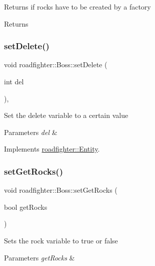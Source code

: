 Returns if rocks have to be created by a factory \begin{DoxyReturn}{Returns}

\end{DoxyReturn}
\mbox{\label{classroadfighter_1_1Boss_a8e2d5737afc0df4bc8b8ad0ddc03f5b8}} 
\subsubsection{\texorpdfstring{set\+Delete()}{setDelete()}}
{\footnotesize\ttfamily void roadfighter\+::\+Boss\+::set\+Delete (\begin{DoxyParamCaption}\item[{int}]{del }\end{DoxyParamCaption})\hspace{0.3cm}{\ttfamily [override]}, {\ttfamily [virtual]}}

Set the delete variable to a certain value 
\begin{DoxyParams}{Parameters}
{\em del} & \\
\hline
\end{DoxyParams}


Implements \hyperlink{classroadfighter_1_1Entity_a07e973f0fa941a69e749629716877692}{roadfighter\+::\+Entity}.

\mbox{\label{classroadfighter_1_1Boss_a86ef044739f08440f8b63a17f3e60d01}} 
\subsubsection{\texorpdfstring{set\+Get\+Rocks()}{setGetRocks()}}
{\footnotesize\ttfamily void roadfighter\+::\+Boss\+::set\+Get\+Rocks (\begin{DoxyParamCaption}\item[{bool}]{get\+Rocks }\end{DoxyParamCaption})}

Sets the rock variable to true or false 
\begin{DoxyParams}{Parameters}
{\em get\+Rocks} & \\
\hline
\end{DoxyParams}
\mbox{\label{classroadfighter_1_1Boss_a170c46fc7f03d6e59633c370c6fd478c}} 
